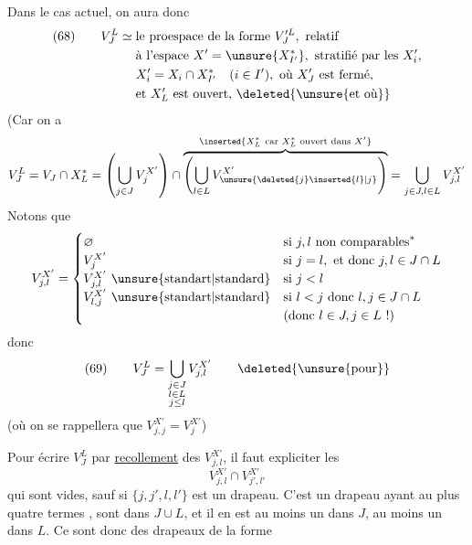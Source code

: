 
Dans le cas actuel, on aura donc
\[
\begin{aligned}
(68)\qquad V_J^L\simeq{}&\text{le proespace de la forme }V_J^{\prime L},\text{ relatif}\\
&\text{à l'espace }X'=\unsure{X_{I'}^*},\text{ stratifié par les }X_i',\\
&X_i'=X_i\cap X_{I'}^*\quad(i\in I'),\text{ où }X_J'\text{ est fermé,}\\
&\text{et }X_L'\text{ est ouvert, }\deleted{\unsure{\text{et où}}}
\end{aligned}
\]
(Car on a
\[
V_J^L=V_J\cap X_L^*
=\left(\bigcup_{j\in J}V_j^{X'}\right)\cap
\overbrace{\left(\bigcup_{l\in L}V_{\unsure{\deleted{j}\inserted{l}|j}}^{X'}\right)}^{\inserted{X_L^*\ \text{car }X_L^*\text{ ouvert dans }X'}}
=\bigcup_{j\in J,l\in L}V_{j,l}^{X'}
\]
Notons que
\[
V_{j,l}^{X'}=
\begin{cases}
\varnothing&\text{si }j,l\text{ non comparables}^*\\
V_j^{X'}&\text{si }j=l,\text{ et donc }j,l\in J\cap L\\
V_{j,l}^{X'}\ \text{\unsure{standart|standard}}&\text{si }j<l\\
V_{l,j}^{X'}\ \text{\unsure{standart|standard}}&\text{si }l<j\text{ donc }l,j\in J\cap L\\
&\text{(donc }l\in J,j\in L\text{ !)}
\end{cases}
\]
donc
\[
(69)\qquad V_J^L=\bigcup_{\substack{j\in J\\l\in L\\j\leq l}}V_{j,l}^{X'}\qquad\deleted{\text{\unsure{pour}}}
\]
(où on se rappellera que $V_{j,j}^{X'}=V_j^{X'}$)


Pour écrire $V_J^L$ par \uline{recollement} des $V_{j,l}^{X'}$, il faut expliciter les
\[
V_{j,l}^{X'}\cap V_{j',l'}^{X'}
\]
qui sont vides, sauf si $\{j,j',l,l'\}$ est un drapeau. C'est un drapeau  ayant au plus quatre termes ,   sont dans $J\cup L$, et il en est au  moins un dans $J$, au moins un dans $L$. Ce sont donc des drapeaux de la forme
